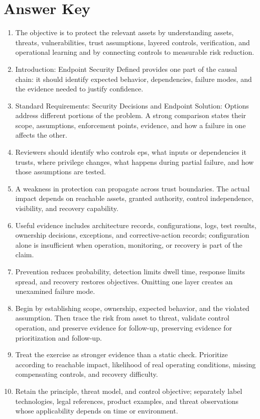 \documentclass[11pt]{article}
\begin{document}
\section*{Answer Key}
\begin{enumerate}
\item The objective is to protect the relevant assets by understanding assets, threats, vulnerabilities, trust assumptions, layered controls, verification, and operational learning and by connecting controls to measurable risk reduction.
\item Introduction: Endpoint Security Defined provides one part of the causal chain: it should identify expected behavior, dependencies, failure modes, and the evidence needed to justify confidence.
\item Standard Requirements: Security Decisions and Endpoint Solution: Options address different portions of the problem. A strong comparison states their scope, assumptions, enforcement points, evidence, and how a failure in one affects the other.
\item Reviewers should identify who controls eps, what inputs or dependencies it trusts, where privilege changes, what happens during partial failure, and how those assumptions are tested.
\item A weakness in protection can propagate across trust boundaries. The actual impact depends on reachable assets, granted authority, control independence, visibility, and recovery capability.
\item Useful evidence includes architecture records, configurations, logs, test results, ownership decisions, exceptions, and corrective-action records; configuration alone is insufficient when operation, monitoring, or recovery is part of the claim.
\item Prevention reduces probability, detection limits dwell time, response limits spread, and recovery restores objectives. Omitting one layer creates an unexamined failure mode.
\item Begin by establishing scope, ownership, expected behavior, and the violated assumption. Then trace the risk from asset to threat, validate control operation, and preserve evidence for follow-up, preserving evidence for prioritization and follow-up.
\item Treat the exercise as stronger evidence than a static check. Prioritize according to reachable impact, likelihood of real operating conditions, missing compensating controls, and recovery difficulty.
\item Retain the principle, threat model, and control objective; separately label technologies, legal references, product examples, and threat observations whose applicability depends on time or environment.
\end{enumerate}
\end{document}
